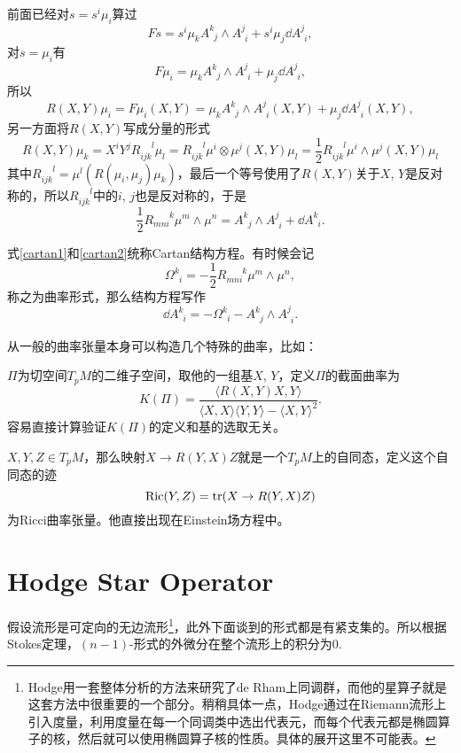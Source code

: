 前面已经对$s=s^i\mu_i$算过
\[
	F s=s^i \mu_k A^{k}_{\phantom{k}j}\wedge A^{j}_{\phantom{j}i}+s^i\mu_j\dd A^{j}_{\phantom{j}i},
\]
对$s=\mu_i$有
\[
	F \mu_i=\mu_k A^{k}_{\phantom{k}j}\wedge A^{j}_{\phantom{j}i}+\mu_j\dd A^{j}_{\phantom{j}i},
\]
所以
\[
	R(X,Y) \mu_i=F \mu_i(X,Y)=\mu_k A^{k}_{\phantom{k}j}\wedge A^{j}_{\phantom{j}i}(X,Y)+\mu_j\dd A^{j}_{\phantom{j}i}(X,Y),
\]
另一方面将$R(X,Y)$写成分量的形式
\[
	R(X,Y) \mu_k=X^iY^jR_{ijk}^{\phantom{ijk}l}\mu_l=R_{ijk}^{\phantom{ijk}l} \mu^i\otimes\mu^j(X,Y)\mu_l=\frac{1}{2}R_{ijk}^{\phantom{ijk}l} \mu^i\wedge\mu^j(X,Y)\mu_l
\]
其中$R_{ijk}^{\phantom{ijk}l}=\mu^l(R(\mu_i,\mu_j)\mu_k)$，最后一个等号使用了$R(X,Y)$关于$X$, $Y$是反对称的，所以$R_{ijk}^{\phantom{ijk}l}$中的$i$, $j$也是反对称的，于是
\begin{equation}
	\frac{1}{2}R_{mni}^{\phantom{mni}k} \mu^m\wedge\mu^n=A^{k}_{\phantom{k}j}\wedge A^{j}_{\phantom{j}i}+\dd A^{k}_{\phantom{k}i}.
	\label{cartan2}
\end{equation}

式\eqref{cartan1}和\eqref{cartan2}统称Cartan结构方程。有时候会记
\[
	\Omega^{k}_{\phantom{k}i}=-\frac{1}{2}R_{mni}^{\phantom{mni}k} \mu^m\wedge\mu^n,
\]
称之为曲率形式，那么结构方程写作
\[
	\dd A^{k}_{\phantom{k}i}=-\Omega^{k}_{\phantom{k}i}-A^{k}_{\phantom{k}j}\wedge A^{j}_{\phantom{j}i}.
\]

从一般的曲率张量本身可以构造几个特殊的曲率，比如：

\para $\Pi$为切空间$T_pM$的二维子空间，取他的一组基$X$, $Y$，定义$\Pi$的截面曲率为
\[
	K(\Pi)=\frac{\langle R(X,Y)X,Y\rangle}{\langle X,X\rangle\langle Y,Y \rangle-\langle X,Y \rangle^2}.
\]
容易直接计算验证$K(\Pi)$的定义和基的选取无关。

\para $X,Y,Z\in T_p M$，那么映射$X\to R(Y,X)Z$就是一个$T_p M$上的自同态，定义这个自同态的迹
\[
	\mathrm{Ric}(Y,Z)=\operatorname{tr} (X\to R(Y,X)Z)
\]
为Ricci曲率张量。他直接出现在Einstein场方程中。

\section{Hodge Star Operator}

假设流形是可定向的无边流形\footnote{Hodge用一套整体分析的方法来研究了de Rham上同调群，而他的星算子就是这套方法中很重要的一个部分。稍稍具体一点，Hodge通过在Riemann流形上引入度量，利用度量在每一个同调类中选出代表元，而每个代表元都是椭圆算子的核，然后就可以使用椭圆算子核的性质。具体的展开这里不可能表。}，此外下面谈到的形式都是有紧支集的。所以根据Stokes定理，$(n-1)$-形式的外微分在整个流形上的积分为0.

